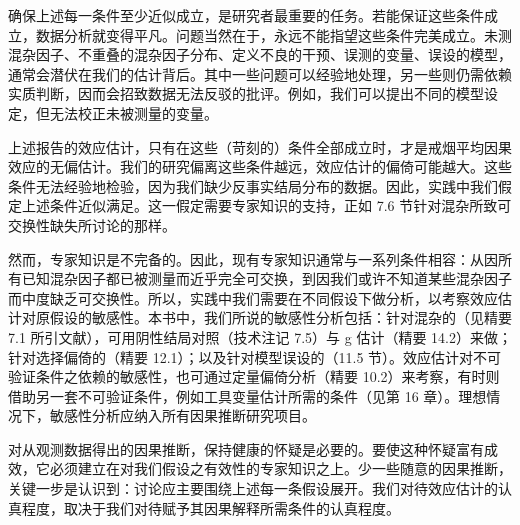 确保上述每一条件至少近似成立，是研究者最重要的任务。若能保证这些条件成立，数据分析就变得平凡。问题当然在于，永远不能指望这些条件完美成立。未测混杂因子、不重叠的混杂因子分布、定义不良的干预、误测的变量、误设的模型，通常会潜伏在我们的估计背后。其中一些问题可以经验地处理，另一些则仍需依赖实质判断，因而会招致数据无法反驳的批评。例如，我们可以提出不同的模型设定，但无法校正未被测量的变量。

上述报告的效应估计，只有在这些（苛刻的）条件全部成立时，才是戒烟平均因果效应的无偏估计。我们的研究偏离这些条件越远，效应估计的偏倚可能越大。这些条件无法经验地检验，因为我们缺少反事实结局分布的数据。因此，实践中我们假定上述条件近似满足。这一假定需要专家知识的支持，正如 7.6 节针对混杂所致可交换性缺失所讨论的那样。

然而，专家知识是不完备的。因此，现有专家知识通常与一系列条件相容：从因所有已知混杂因子都已被测量而近乎完全可交换，到因我们或许不知道某些混杂因子而中度缺乏可交换性。所以，实践中我们需要在不同假设下做分析，以考察效应估计对原假设的敏感性。本书中，我们所说的敏感性分析包括：针对混杂的（见精要 7.1 所引文献），可用阴性结局对照（技术注记 7.5）与 g 估计（精要 14.2）来做；针对选择偏倚的（精要 12.1）；以及针对模型误设的（11.5 节）。效应估计对不可验证条件之依赖的敏感性，也可通过定量偏倚分析（精要 10.2）来考察，有时则借助另一套不可验证条件，例如工具变量估计所需的条件（见第 16 章）。理想情况下，敏感性分析应纳入所有因果推断研究项目。

对从观测数据得出的因果推断，保持健康的怀疑是必要的。要使这种怀疑富有成效，它必须建立在对我们假设之有效性的专家知识之上。少一些随意的因果推断，关键一步是认识到：讨论应主要围绕上述每一条假设展开。我们对待效应估计的认真程度，取决于我们对待赋予其因果解释所需条件的认真程度。

